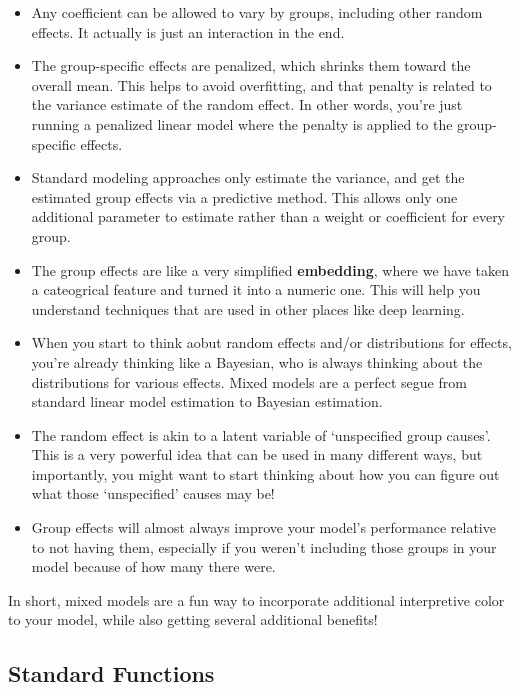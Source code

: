 \documentclass[
  letterpaper,
]{krantz}
\providecommand{\tightlist}{%
  \setlength{\itemsep}{0pt}\setlength{\parskip}{0pt}}\usepackage{longtable,booktabs,array}
\begin{document}
\begin{itemize}
\tightlist
\item
  Any coefficient can be allowed to vary by groups, including other
  random effects. It actually is just an interaction in the end.
\item
  The group-specific effects are penalized, which shrinks them toward
  the overall mean. This helps to avoid overfitting, and that penalty is
  related to the variance estimate of the random effect. In other words,
  you're just running a penalized linear model where the penalty is
  applied to the group-specific effects.
\item
  Standard modeling approaches only estimate the variance, and get the
  estimated group effects via a predictive method. This allows only one
  additional parameter to estimate rather than a weight or coefficient
  for every group.
\item
  The group effects are like a very simplified \textbf{embedding}, where
  we have taken a cateogrical feature and turned it into a numeric one.
  This will help you understand techniques that are used in other places
  like deep learning.
\item
  When you start to think aobut random effects and/or distributions for
  effects, you're already thinking like a Bayesian, who is always
  thinking about the distributions for various effects. Mixed models are
  a perfect segue from standard linear model estimation to Bayesian
  estimation.
\item
  The random effect is akin to a latent variable of `unspecified group
  causes'. This is a very powerful idea that can be used in many
  different ways, but importantly, you might want to start thinking
  about how you can figure out what those `unspecified' causes may be!
\item
  Group effects will almost always improve your model's performance
  relative to not having them, especially if you weren't including those
  groups in your model because of how many there were.
\end{itemize}

In short, mixed models are a fun way to incorporate additional
interpretive color to your model, while also getting several additional
benefits!

\subsection{Standard Functions}\label{sec-mixed-models-standard}
\end{document}
